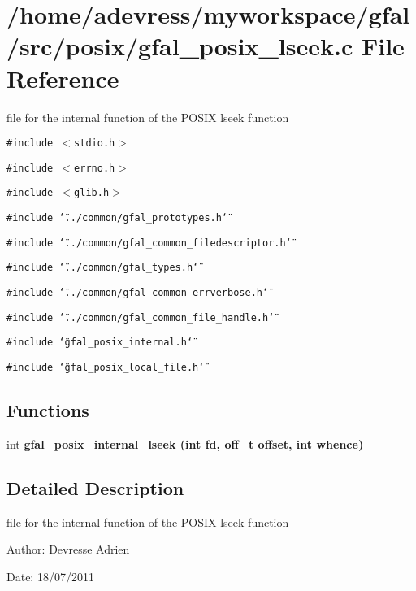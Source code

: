\section{/home/adevress/myworkspace/gfal/src/posix/gfal\_\-posix\_\-lseek.c File Reference}
\label{gfal__posix__lseek_8c}
file for the internal function of the POSIX lseek function 

{\tt \#include $<$stdio.h$>$}\par
{\tt \#include $<$errno.h$>$}\par
{\tt \#include $<$glib.h$>$}\par
{\tt \#include \char`\"{}../common/gfal\_\-prototypes.h\char`\"{}}\par
{\tt \#include \char`\"{}../common/gfal\_\-common\_\-filedescriptor.h\char`\"{}}\par
{\tt \#include \char`\"{}../common/gfal\_\-types.h\char`\"{}}\par
{\tt \#include \char`\"{}../common/gfal\_\-common\_\-errverbose.h\char`\"{}}\par
{\tt \#include \char`\"{}../common/gfal\_\-common\_\-file\_\-handle.h\char`\"{}}\par
{\tt \#include \char`\"{}gfal\_\-posix\_\-internal.h\char`\"{}}\par
{\tt \#include \char`\"{}gfal\_\-posix\_\-local\_\-file.h\char`\"{}}\par
\subsection*{Functions}
\begin{CompactItemize}
\item 
int \bf{gfal\_\-posix\_\-internal\_\-lseek} (int fd, off\_\-t offset, int whence)
\end{CompactItemize}


\subsection{Detailed Description}
file for the internal function of the POSIX lseek function 

\begin{Desc}
\item[Author:]Devresse Adrien \end{Desc}
\begin{Desc}
\item[Date:]18/07/2011 \end{Desc}


